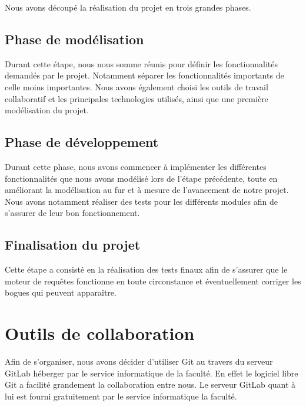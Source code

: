 \documentclass[oneside,13pt,a4paper]{report}
\begin{document}
            Nous avons découpé la réalisation du projet en trois grandes phases.

            \subsection{Phase de modélisation}

                Durant cette étape, nous nous somme réunis pour définir les fonctionnalités demandés par le projet. Notamment séparer les fonctionnalités importants de celle moins importantes. Nous avons également choisi les outils de travail collaboratif et les principales technologies utilisés, ainsi que une première modélisation du projet.

            \subsection{Phase de développement}

                Durant cette phase, nous avons commencer à implémenter les différentes fonctionnalités que nous avons modélisé lors de l’étape précédente, toute en améliorant la modélisation au fur et à mesure de l’avancement de notre projet. Nous avons notamment réaliser des tests pour les différents modules afin de s’assurer de leur bon fonctionnement.

            \subsection{Finalisation du projet}

                Cette étape a consisté en la réalisation des tests finaux afin de s’assurer que le moteur de requêtes fonctionne en toute circonstance et éventuellement corriger les bogues qui peuvent apparaître.

        \section{Outils de collaboration}

            Afin de s’organiser, nous avons décider d’utiliser Git au travers du serveur GitLab héberger par le service informatique de la faculté. En effet le logiciel libre Git a facilité grandement la collaboration entre nous. Le serveur GitLab quant à lui est fourni gratuitement par le service informatique la faculté.

\end{document}
